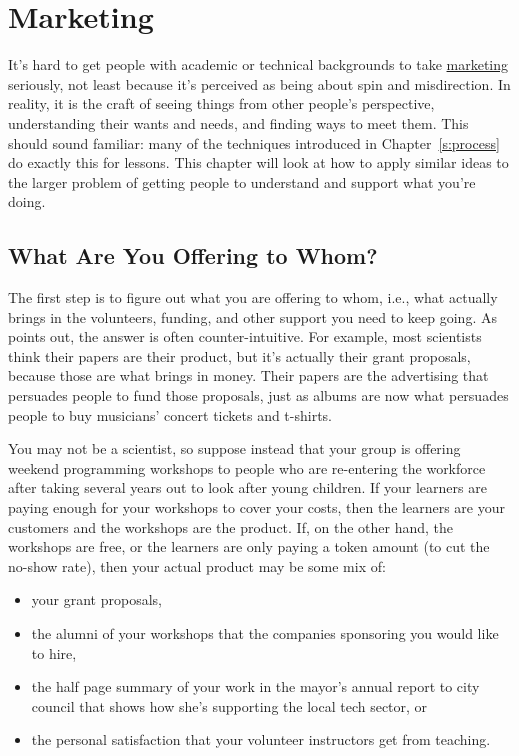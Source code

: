 \chapter{Marketing}\label{s:marketing}

It's hard to get people with academic or technical backgrounds to take
\protect\hyperlink{g:marketing}{marketing} seriously, not least because it's perceived
as being about spin and misdirection. In reality, it is the craft of
seeing things from other people's perspective, understanding their
wants and needs, and finding ways to meet them. This should sound
familiar: many of the techniques introduced in Chapter~\ref{s:process}
do exactly this for lessons. This chapter will look at how to apply
similar ideas to the larger problem of getting people to understand
and support what you're doing.

\section{What Are You Offering to Whom?}\label{s:marketing-what-whom}

The first step is to figure out what you are offering to whom, i.e.,
what actually brings in the volunteers, funding, and other support you
need to keep going. As \cite{Kuch2011} points out, the answer is
often counter-intuitive. For example, most scientists think their papers
are their product, but it's actually their grant proposals, because
those are what brings in money. Their papers are the advertising that
persuades people to fund those proposals, just as albums are now what
persuades people to buy musicians' concert tickets and t-shirts.

You may not be a scientist, so suppose instead that your group is
offering weekend programming workshops to people who are re-entering the
workforce after taking several years out to look after young children.
If your learners are paying enough for your workshops to cover your
costs, then the learners are your customers and the workshops are the
product. If, on the other hand, the workshops are free, or the learners
are only paying a token amount (to cut the no-show rate), then your
actual product may be some mix of:

\begin{itemize}
\item
  your grant proposals,
\item
  the alumni of your workshops that the companies sponsoring you would
  like to hire,
\item
  the half page summary of your work in the mayor's annual report to
  city council that shows how she's supporting the local tech sector,
  or
\item
  the personal satisfaction that your volunteer instructors get from
  teaching.
\end{itemize}

